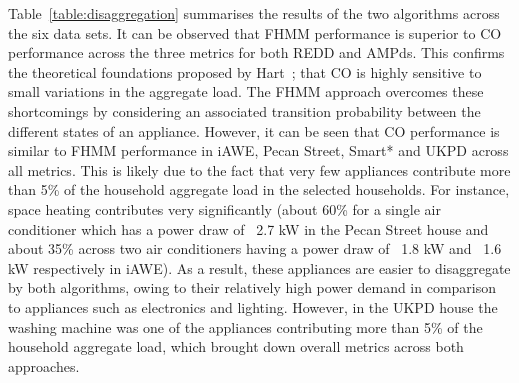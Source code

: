 \documentclass{sig-alternate}
\newcommand{\redcolor}[1]{\textcolor{red}{#1}}
\newcommand{\tabref}[1]{Table~\ref{#1}}
\begin{document}

\tabref{table:disaggregation} summarises the results of the two
algorithms across the six data sets. It can be observed that FHMM
performance is superior to CO performance across the three metrics for
both REDD and AMPds. This confirms the theoretical foundations
proposed by Hart~\cite{hart_1992}; that CO is highly sensitive to
small variations in the aggregate load. The FHMM approach overcomes
these shortcomings by considering an associated transition probability
between the different states of an appliance. However, it can be seen
that CO performance is similar to FHMM performance in iAWE, Pecan
Street, Smart* and UKPD across all metrics. This is likely due to the
fact that very few appliances contribute more than 5\% of the
household aggregate load in the selected households. For instance,
space heating contributes very significantly (about 60\% for a single
air conditioner which has a power draw of ~2.7 kW in the Pecan Street
house and about 35\% across two air conditioners having a power draw
of ~1.8 kW and ~1.6 kW respectively in iAWE). As a result, these
appliances are easier to disaggregate by both algorithms, owing to
their relatively high power demand in comparison to appliances such as
electronics and lighting. However, in the UKPD house the washing
machine was one of the appliances contributing more than 5\% of the
household aggregate load, which brought down overall metrics across
both approaches.
\end{document}

